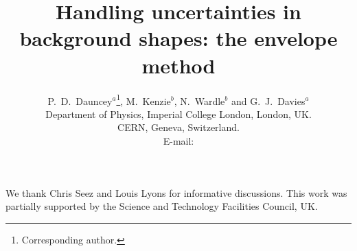 \documentclass{JINST}
\title{Handling uncertainties in background shapes: the envelope method}
\author{P.~D.~Dauncey$^a$\thanks{Corresponding author.},
M.~Kenzie$^b$, N.~Wardle$^b$ and G.~J.~Davies$^a$\\
\llap{$^a$}Department of Physics, Imperial College London, London, UK.\\
\llap{$^b$}CERN, Geneva, Switzerland.\\
E-mail: \email{P.Dauncey@imperial.ac.uk}}
\begin{document}







\acknowledgments
We thank Chris Seez and Louis Lyons for informative discussions.
This work was partially supported by the Science and Technology Facilities
Council, UK.



%
\end{document}
